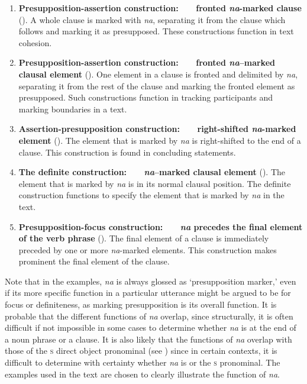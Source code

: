 \newpage
\begin{enumerate}
\item \textbf{Presupposition-assertion construction:~~~ fronted \textit{na}{}-marked clause} (). A whole clause is marked with \textit{na}, separating it from the clause which follows and marking it as presupposed. These constructions function in text cohesion. 
\item \textbf{Presupposition-assertion construction:~~~ fronted \textit{na}–marked clausal element} (). One element in a clause is fronted and delimited by \textit{na}, separating it from the rest of the clause and marking the fronted element as presupposed. Such constructions function in tracking participants and marking boundaries in a text. 
\item \textbf{Assertion-presupposition construction:~~~ right-shifted \textit{na}-marked element} (). The element that is marked by \textit{na} is right-shifted to the end of a clause. This construction is found in concluding statements. 
\item \textbf{The definite construction:~~~ \textit{na}–marked clausal element} (). The element that is marked by \textit{na} is in its normal clausal position. The definite construction functions to specify the element that is marked by \textit{na} in the text. 
\item \textbf{Presupposition-focus construction:~~~ \textit{na} precedes the final element of the verb phrase} (). The final element of a clause is immediately preceded by one or more \textit{na}{}-marked elements. This construction makes prominent the final element of the clause. 
\end{enumerate}

Note that in the examples, \textit{na} is always glossed as {\PSP} ‘presupposition marker,’ even if its more specific function in a particular utterance might be argued to be for focus or definiteness, as marking presupposition is its overall function. It is probable that the different functions of \textit{na} overlap, since structurally, it is often difficult if not impossible in some cases to determine whether \textit{na} is at the end of a noun phrase  or a clause. It is also likely that the functions of \textit{na} overlap with those of the \textsc{s} direct object pronominal (see ) since in certain contexts, it is difficult to determine with certainty whether \textit{na} is {\PSP} or the \textsc{s} \DO pronominal. The examples used in the text are chosen to clearly illustrate the function of \textit{na}.

